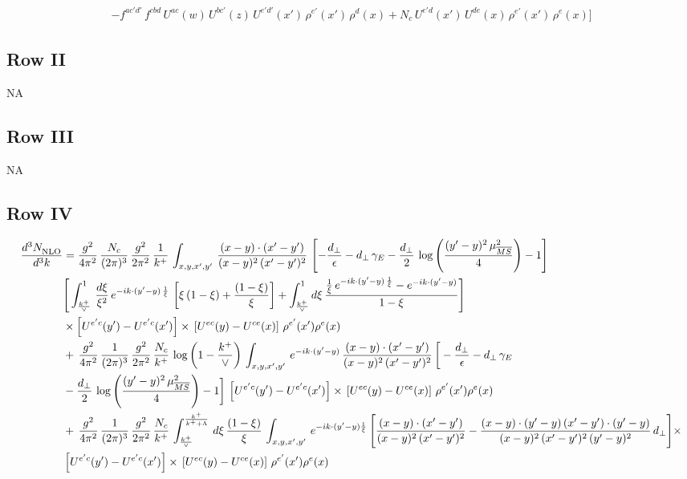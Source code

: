 \documentclass[9pt]{article}
\numberwithin{equation}{section}
\begin{document}
\begin{align}
-f^{ac'd'}\,f^{cbd}\,U^{ac}(w)\,U^{bc'}(z)\,U^{e'd'}(x')\,\rho^{e'}(x')\,\rho^{d}(x) +N_{c}\,U^{e'd}(x')\,U^{de}(x)\,\rho^{e'}(x')\,\rho^{e}(x)\Bigg]
\end{align}
\subsection{Row II}
\textsc{NA}
\subsection{Row III}
\textsc{NA}
\subsection{Row IV}
\begin{align}
    \frac{d^{3}N_{\rm NLO}^{\rm}}{d^{3}k}  & = \frac{g^{2}}{4\pi^{2}}\, \frac{N_{c}}{(2\pi)^{3}}\,\frac{g^{2}}{2\pi^{2}}\, \frac{1}{k^{+}}\,\int_{x,y,x',y'}\,\frac{(x-y)\cdot (x'-y')}{(x-y)^{2}\,(x'-y')^{2}}\,\left[-\frac{d_{\perp}}{\epsilon}-d_{\perp}\,\gamma_{E}-\frac{d_{\perp}}{2}\,\log{\left(\frac{(y'-y)^{2}\,\mu^{2}_{\overline{MS}}}{4}\right)}-1\right]\,\notag \\ & \Bigg[\int_{\frac{k^{+}}{\vee}}^{1}\,\frac{d\xi}{\xi^{2}}\,e^{-ik\cdot (y'-y)\,\frac{1}{\xi}}\,\left[\xi\,(1-\xi)+\frac{(1-\xi)}{\xi}\right]+\int_{\frac{k^{+}}{\vee}}^{1}d\xi\,\frac{\frac{1}{\xi}\,e^{-ik\cdot (y'-y)\,\frac{1}{\xi}}-e^{-ik\cdot (y'-y)}}{1-\xi}\Bigg]\notag \\ & \times \left[U^{e'c}(y') - U^{e'c}(x')\right] \times\, \left[U^{ec}(y) - U^{ce}(x)\right]\, \rho^{e'}(x') \rho^{e}(x)\notag \\ &  +\, \frac{g^{2}}{4\pi^{2}}\, \frac{1}{(2\pi)^{3}}\,\frac{g^{2}}{2\pi^{2}}\, \frac{N_{c}}{k^{+}}\, \log{\left(1-\frac{k^{+}}{\vee}\right)}\,\int_{x,y,x',y'}\,e^{-ik\cdot (y'-y)}\,\frac{(x-y)\cdot (x'-y')}{(x-y)^{2}\,(x'-y')^{2}}\,\bigg[-\frac{d_{\perp}}{\epsilon}-d_{\perp}\,\gamma_{E}\notag \\ & -\frac{d_{\perp}}{2}\,\log{\left(\frac{(y'-y)^{2}\,\mu^{2}_{\overline{MS}}}{4}\right)}-1\bigg]\,\left[U^{e'c}(y') - U^{e'c}(x')\right] \times\, \left[U^{ec}(y) - U^{ce}(x)\right]\, \rho^{e'}(x') \rho^{e}(x)\notag \\ & +\,\frac{g^{2}}{4\pi^{2}}\, \frac{1}{(2\pi)^{3}}\,\frac{g^{2}}{2\pi^{2}}\, \frac{N_{c}}{k^{+}}\,\int_{\frac{k^{+}}{\vee}}^{\frac{k^{+}}{k^{+}+\Lambda}}\,d\xi\, \frac{(1-\xi)}{\xi}\, \int_{x,y,x',y'}\,e^{-ik\cdot (y'-y)\frac{1}{\xi}}\,\Bigg[\frac{(x-y)\cdot (x'-y')}{(x-y)^{2}\, (x'-y')^{2}} -\frac{(x-y)\cdot (y'-y)\, (x'-y')\cdot (y'-y)}{(x-y)^{2}\,(x'-y')^{2}\,(y'-y)^{2}}\,d_{\perp}\Bigg]\times\notag \\ &  \left[U^{e'c}(y') - U^{e'c}(x')\right] \times\, \left[U^{ec}(y) - U^{ce}(x)\right]\, \rho^{e'}(x') \rho^{e}(x)

\end{align}
\end{document}
